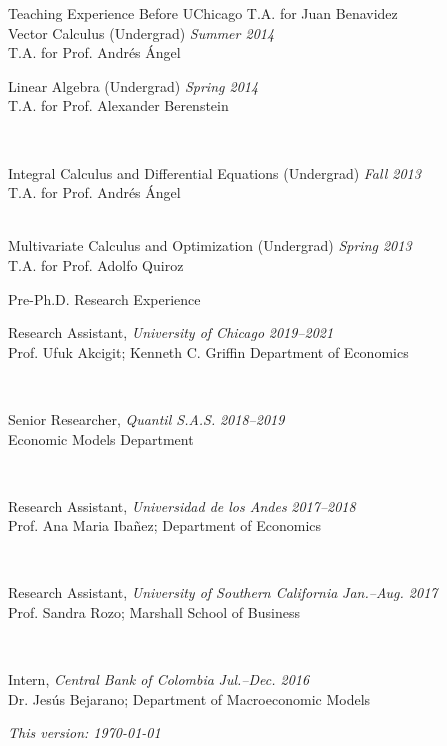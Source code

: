 \documentclass{resume} %
\begin{document}
\begin{rSection}{Teaching Experience Before UChicago}
		{\small T.A. for Juan Benavidez}\\[0.35em]
		Vector Calculus (Undergrad) \hfill {\em Summer 2014}\\[-0.25em]
		{\small T.A. for Prof. Andrés Ángel}\\[0.35em]
		\parbox{\linewidth}{Linear Algebra (Undergrad) \hfill {\em Spring 2014}\\[-0.25em]
		{\small T.A. for Prof. Alexander Berenstein}}\\[0.35em]
		\parbox{\linewidth}{Integral Calculus and Differential Equations (Undergrad) \hfill {\em Fall 2013}\\[-0.25em]
		{\small T.A. for Prof. Andrés Ángel}}\\[0.35em]
		Multivariate Calculus and Optimization (Undergrad) \hfill {\em Spring 2013}\\[-0.25em]
		{\small T.A. for Prof. Adolfo Quiroz}
	\end{rSection}

	\pagebreak
	\begin{rSection}{Pre-Ph.D. Research Experience}
		\parbox{\linewidth}{Research Assistant, \textit{University of Chicago} \hfill {\em 2019--2021}\\[-0.25em]
		{\small Prof. Ufuk Akcigit; Kenneth C. Griffin Department of Economics}}\\[0.35em]

		\parbox{\linewidth}{Senior Researcher, \textit{Quantil S.A.S.} \hfill {\em 2018--2019}\\[-0.25em]
		{\small Economic Models Department}}\\[0.35em]

		\parbox{\linewidth}{Research Assistant, \textit{Universidad de los Andes} \hfill {\em 2017--2018}\\[-0.25em]
		{\small Prof. Ana Maria Ibañez; Department of Economics}}\\[0.35em]

		\parbox{\linewidth}{Research Assistant, \textit{University of Southern California} \hfill {\em Jan.--Aug. 2017}\\[-0.25em]
		{\small Prof. Sandra Rozo; Marshall School of Business}}\\[0.35em]

		\parbox{\linewidth}{Intern, \textit{Central Bank of Colombia} \hfill {\em Jul.--Dec. 2016}\\[-0.25em]
		{\small Dr. Jesús Bejarano; Department of Macroeconomic Models}}
	\end{rSection}

	\vfill
	\flushright \textit{This version: \today}
\end{document}
